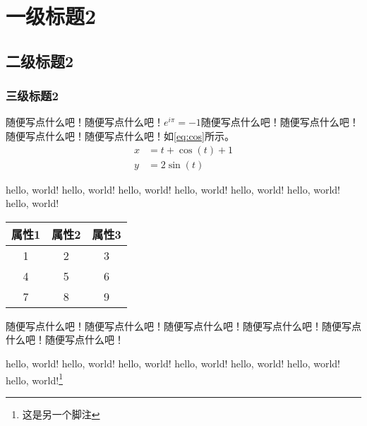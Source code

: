 \chapter{一级标题2}
\section{二级标题2}
\subsection{三级标题2}
随便写点什么吧！随便写点什么吧！$e^{i\pi}=-1$随便写点什么吧！随便写点什么吧！随便写点什么吧！随便写点什么吧！如\ref{eq:cos}所示。
\begin{align}
    x &=t+\cos(t)  + 1 \label{eq:cos}  \\
    y &=2\sin(t)
\end{align}


hello, world! hello, world! hello, world! hello, world! hello, world! hello, world! hello, world!

\begin{table}[h]

\begin{center}
    \begin{tabular}{ccc} 
    \toprule
    \textbf{属性1} & \textbf{属性2} & \textbf{属性3} \\ \midrule
    1            & 2            & 3            \\
    4            & 5            & 6            \\
    7            & 8            & 9            \\ \bottomrule
    \end{tabular}
\end{center}\label{tab:exp_table}

\end{table}

随便写点什么吧！随便写点什么吧！随便写点什么吧！随便写点什么吧！随便写点什么吧！随便写点什么吧！

hello, world! hello, world! hello, world! hello, world! hello, world! hello, world! hello, world!\footnote{这是另一个脚注}